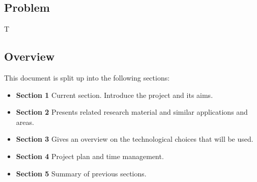 \subsection{Problem}
T\lipsum[4]

\subsection{Overview}
This document is split up into the following sections:
\begin{itemize}
 \item \textbf{Section 1} Current section. Introduce the project and its aims.
 \item \textbf{Section 2} Presents related research material and similar applications and areas.
 \item \textbf{Section 3} Gives an overview on the technological choices that will be used.
 \item \textbf{Section 4} Project plan and time management.
 \item \textbf{Section 5} Summary of previous sections.
\end{itemize}

